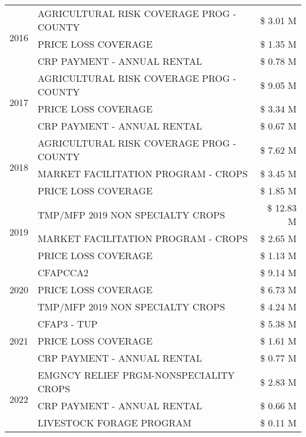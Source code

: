 \begin{tabular}{llr}
\cline{1-3}
\multirow[t]{3}{*}{2016} & AGRICULTURAL RISK COVERAGE PROG - COUNTY & \$ 3.01 M \\
 & PRICE LOSS COVERAGE & \$ 1.35 M \\
 & CRP PAYMENT - ANNUAL RENTAL & \$ 0.78 M \\
\cline{1-3}
\multirow[t]{3}{*}{2017} & AGRICULTURAL RISK COVERAGE PROG - COUNTY & \$ 9.05 M \\
 & PRICE LOSS COVERAGE & \$ 3.34 M \\
 & CRP PAYMENT - ANNUAL RENTAL & \$ 0.67 M \\
\cline{1-3}
\multirow[t]{3}{*}{2018} & AGRICULTURAL RISK COVERAGE PROG - COUNTY & \$ 7.62 M \\
 & MARKET FACILITATION PROGRAM - CROPS & \$ 3.45 M \\
 & PRICE LOSS COVERAGE & \$ 1.85 M \\
\cline{1-3}
\multirow[t]{3}{*}{2019} & TMP/MFP 2019 NON SPECIALTY CROPS & \$ 12.83 M \\
 & MARKET FACILITATION PROGRAM - CROPS & \$ 2.65 M \\
 & PRICE LOSS COVERAGE & \$ 1.13 M \\
\cline{1-3}
\multirow[t]{3}{*}{2020} & CFAPCCA2 & \$ 9.14 M \\
 & PRICE LOSS COVERAGE & \$ 6.73 M \\
 & TMP/MFP 2019 NON SPECIALTY CROPS & \$ 4.24 M \\
\cline{1-3}
\multirow[t]{3}{*}{2021} & CFAP3 - TUP & \$ 5.38 M \\
 & PRICE LOSS COVERAGE & \$ 1.61 M \\
 & CRP PAYMENT - ANNUAL RENTAL & \$ 0.77 M \\
\cline{1-3}
\multirow[t]{3}{*}{2022} & EMGNCY RELIEF PRGM-NONSPECIALITY CROPS & \$ 2.83 M \\
 & CRP PAYMENT - ANNUAL RENTAL & \$ 0.66 M \\
 & LIVESTOCK FORAGE PROGRAM & \$ 0.11 M \\
\cline{1-3}
\bottomrule
\end{tabular}
